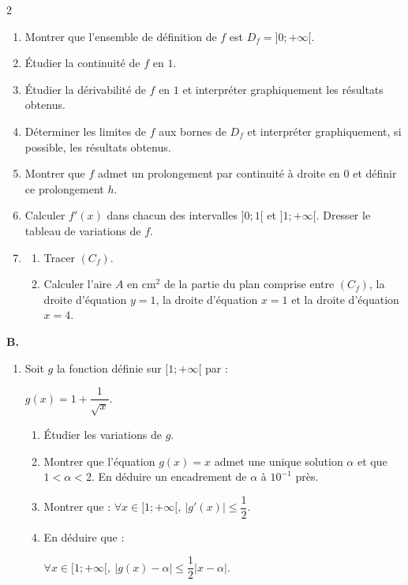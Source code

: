 \documentclass[12pt,a4paper]{article}
\begin{document}
\begin{multicols}{2}
\begin{enumerate}
\item Montrer que l’ensemble de définition de $f$ est  
\( D_f=]0;+\infty[. \)

\item Étudier la continuité de $f$ en $1$.

\item Étudier la dérivabilité de $f$ en $1$ et interpréter graphiquement les résultats obtenus.

\item Déterminer les limites de $f$ aux bornes de $D_f$ et interpréter graphiquement, si possible, les résultats obtenus.

\item Montrer que $f$ admet un prolongement par continuité à droite en $0$ et définir ce prolongement $h$.

\item Calculer $f'(x)$ dans chacun des intervalles $]0;1[$ et $]1;+\infty[$.  
Dresser le tableau de variations de $f$.

\item 
\begin{enumerate}
\item Tracer $(C_f)$.
\item Calculer l’aire $A$ en cm$^2$ de la partie du plan comprise entre $(C_f)$, la droite d’équation $y=1$, la droite d’équation $x=1$ et la droite d’équation $x=4$.
\end{enumerate}
\end{enumerate}

\textbf{B.}

\begin{enumerate}
\item Soit $g$ la fonction définie sur $[1;+\infty[$ par :  

\( g(x)=1+\dfrac{1}{\sqrt{x}}. \)

\begin{enumerate}
\item Étudier les variations de $g$.
\item Montrer que l’équation $g(x)=x$ admet une unique solution $\alpha$ et que  
\( 1<\alpha<2. \)  
En déduire un encadrement de $\alpha$ à $10^{-1}$ près.
\item Montrer que : \( \forall x\in[1;+\infty[, \ |g'(x)|\leq \dfrac{1}{2}. \)
\item En déduire que : 
 
\( \forall x\in[1;+\infty[, \ |g(x)-\alpha|\leq \dfrac{1}{2}|x-\alpha|. \)
\end{enumerate}


\end{enumerate}
\end{multicols}
\end{document}
